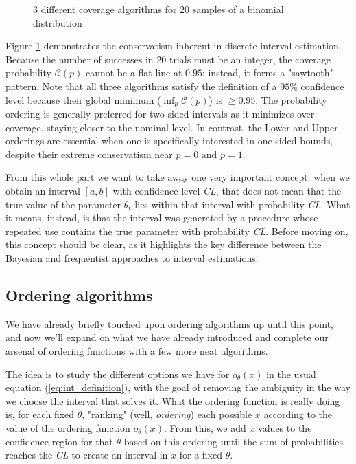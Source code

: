 \begin{figure}[H]
	\centering
	
	\caption{3 different coverage algorithms for $20$ samples of a binomial distribution}
	\label{fig:binomial_coverage}
\end{figure}

Figure \ref{fig:binomial_coverage} demonstrates the conservatism inherent in discrete interval estimation. Because the number of successes in 20 trials must be an integer, the coverage probability $\mathcal{C}(p)$ cannot be a flat line at $0.95$; instead, it forms a "sawtooth" pattern. Note that all three algorithms satisfy the definition of a $95\%$ confidence level because their global minimum ($\inf_p \mathcal{C}(p)$) is $\ge 0.95$. The probability ordering is generally preferred for two-sided intervals as it minimizes over-coverage, staying closer to the nominal level. In contrast, the Lower and Upper orderings are essential when one is specifically interested in one-sided bounds, despite their extreme conservatism near $p=0$ and $p=1$.

From this whole part we want to take away one very important concept: when we obtain an interval $[a,b]$ with confidence level \emph{CL}, that does not mean that the true value of the parameter $\theta_t$ lies within that interval with probability \emph{CL}. What it means, instead, is that the interval was generated by a procedure whose repeated use contains the true parameter with probability \emph{CL}. Before moving on, this concept should be clear, as it highlights the key difference between the Bayesian and frequentist approaches to interval estimations.

\subsection{Ordering algorithms}
\label{subsec:ordering}

We have already briefly touched upon ordering algorithms up until this point, and now we'll expand on what we have already introduced and complete our arsenal of ordering functions with a few more neat algorithms.

The idea is to study the different options we have for $o_{\theta}(x)$ in the usual equation (\ref{eq:int_definition}), with the goal of removing the ambiguity in the way we choose the interval that solves it. What the ordering function is really doing is, for each fixed $\theta$, "ranking" (well, \emph{ordering}) each possible $x$ according to the value of the ordering function $o_{\theta}(x)$. From this, we add $x$ values to the confidence region for that $\theta$ based on this ordering until the sum of probabilities reaches the \emph{CL} to create an interval in $x$ for a fixed $\theta$.


